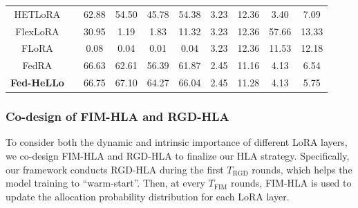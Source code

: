\documentclass[lettersize,journal]{IEEEtran}
\begin{document}
\begin{table}[t]
{\begin{tabular}{c|c|cccc|cccc}
    HETLoRA &       & 62.88 & 54.50 & 45.78 & 54.38 &3.23       & 12.36      & 3.40      & 7.09 \\
    FlexLoRA &       & 30.95 & 1.19  & 1.83  & 11.32 &3.23       &12.36       & 57.66      & 13.33 \\
    FLoRA &       & 0.08  & 0.04  & 0.01  & 0.04  & 3.23      & 12.36      & 11.53      &12.18  \\
    FedRA &       & 66.63 & 62.61 & 56.39 & 61.87 & 2.45      & 11.16      & 4.13      & 6.54 \\
    \textbf{Fed-HeLLo} &       & \cellcolor[rgb]{ .749,  .749,  .749}66.75 & \cellcolor[rgb]{ .749,  .749,  .749}67.10 & \cellcolor[rgb]{ .749,  .749,  .749}64.27 & \cellcolor[rgb]{ .749,  .749,  .749}66.04 & 2.45      &11.28       & 4.13      & 5.75 \\
    \bottomrule[1pt]
  \end{tabular}%
    }
  \label{tab:main-ledgar}%
  
\end{table}%

\subsubsection{Co-design of FIM-HLA and RGD-HLA}\label{sec:design-framework}

To consider both the dynamic and intrinsic importance of different LoRA layers, we co-design FIM-HLA and RGD-HLA to finalize our HLA strategy. 
%
%
{
Specifically, our framework conducts RGD-HLA during the first $T_{\text{RGD}}$ rounds, which helps the model training to ``warm-start''.}
Then, at every $T_{\text{FIM}}$ rounds, FIM-HLA is used to update the allocation probability distribution for each LoRA layer. 
\end{document}
